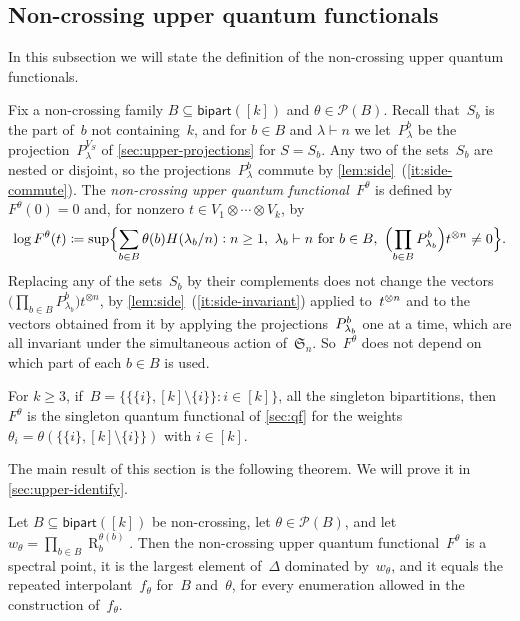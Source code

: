 \documentclass[11pt,letterpaper]{article}
\DeclareMathOperator{\tensorrank}{R}
\newcommand{\bipart}{\mathsf{bipart}}
\begin{document}
\subsection{Non-crossing upper quantum functionals}\label{sec:upper-def}

In this subsection we will state the definition of the non-crossing upper quantum functionals.

Fix a non-crossing family $B \subseteq \bipart([k])$ and $\theta \in \mathcal{P}(B)$. Recall that~$S_b$ is the part of~$b$ not containing~$k$, and for $b \in B$ and $\lambda \vdash n$ we let~$P^b_\lambda$ be the projection~$P^{V_S}_\lambda$ of \cref{sec:upper-projections} for $S = S_b$. Any two of the sets~$S_b$ are nested or disjoint, so the projections~$P^b_\lambda$ commute by \cref{lem:side}~(\ref{it:side-commute}).
The \emph{non-crossing upper quantum functional}~$F^\theta$ is defined by $F^\theta(0) = 0$ and, for nonzero $t \in V_1 \otimes \cdots \otimes V_k$, by
\[
\log F^\theta(t) \coloneqq \sup \Bigl\{ \sum_{b \in B} \theta(b) H(\lambda_b/n) : n \geq 1,\ \lambda_b \vdash n \text{ for } b \in B,\ \Bigl( \prod_{b \in B} P^b_{\lambda_b} \Bigr) t^{\otimes n} \neq 0 \Bigr\}.
\]
Replacing any of the sets~$S_b$ by their complements does not change the vectors $\bigl( \prod_{b \in B} P^b_{\lambda_b} \bigr) t^{\otimes n}$, by \cref{lem:side}~(\ref{it:side-invariant}) applied to~$t^{\smash{\otimes n}}$ and to the vectors obtained from it by applying the projections~$P^b_{\smash{\lambda_b}}$ one at a time, which are all invariant under the simultaneous action of~$\mathfrak{S}_n$. So~$F^\theta$ does not depend on which part of each $b \in B$ is used.

For $k \geq 3$, if~$B = \{\{\{i\}, [k] \setminus \{i\}\} : i \in [k]\}$, all the singleton bipartitions,  then~$F^\theta$ is the singleton quantum functional of \cref{sec:qf} for the weights $\theta_i = \theta(\{\{i\}, [k] \setminus \{i\}\})$ with $i \in [k]$.

The main result of this section is the following theorem. We will prove it in \cref{sec:upper-identify}.

\begin{theorem}\label{th:upper-spectral}
Let $B \subseteq \bipart([k])$ be non-crossing, let $\theta \in \mathcal{P}(B)$, and let $w_\theta = \prod_{b \in B} \tensorrank_b^{\theta(b)}$. Then the non-crossing upper quantum functional~$F^\theta$ is a spectral point, it is the largest element of~$\Delta$ dominated by~$w_\theta$, and it equals the repeated interpolant~$f_\theta$ for~$B$ and~$\theta$, for every enumeration allowed in the construction of~$f_\theta$.
\end{theorem}
\end{document}
